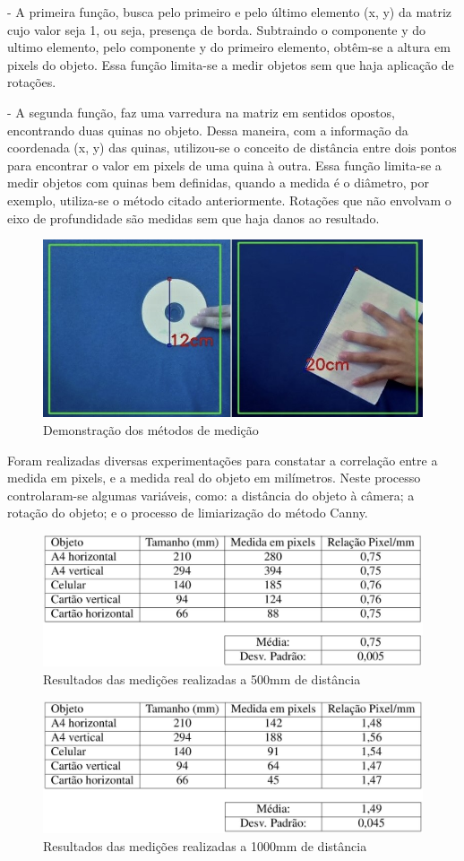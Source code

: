 \documentclass[a4paper,alpha-refs]{RBCA_v1.0}
\begin{document}
- A primeira função, busca pelo primeiro e pelo último elemento (x, y) da matriz cujo valor seja 1, ou seja, presença de borda. Subtraindo o componente y do ultimo elemento, pelo componente y do primeiro elemento, obtêm-se a altura em pixels do objeto. Essa função limita-se a medir objetos sem que haja aplicação de rotações.

- A segunda função, faz uma varredura na matriz em sentidos opostos, encontrando duas quinas no objeto. Dessa maneira, com a informação da coordenada (x, y) das quinas, utilizou-se o conceito de distância entre dois pontos para encontrar o valor em pixels de uma quina à outra. Essa função limita-se a medir objetos com quinas bem definidas, quando a medida é o diâmetro, por exemplo, utiliza-se o método citado anteriormente. Rotações que não envolvam o eixo de profundidade são medidas sem que haja danos ao resultado. 

\begin{figure}[h!]
	\centering
	\includegraphics[width=.3\textwidth]{img/01-IMAGEM1.jpg}
	\caption{Demonstração dos métodos de medição}
	\label{img:img1}
\end{figure}

Foram realizadas diversas experimentações para constatar a correlação entre a medida em pixels, e a medida real do objeto em milímetros. Neste processo controlaram-se algumas variáveis, como: a distância do objeto à câmera; a rotação do objeto; e o processo de limiarização do método Canny.

\begin{figure}[h!]
	\centering
	\includegraphics[width=.3\textwidth]{img/02-TABELA1.JPG}
	\caption{Resultados das medições realizadas a 500mm de distância}
	\label{img:tabela1}
\end{figure}

\begin{figure}[h!]
	\centering
	\includegraphics[width=.3\textwidth]{img/03-TABELA2.JPG}
	\caption{Resultados das medições realizadas a 1000mm de distância}
	\label{img:tabela2}
\end{figure}
\end{document}
